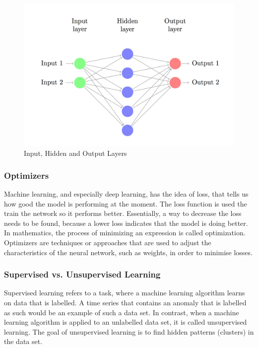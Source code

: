 \begin{figure}[h]
	\centering
	\includegraphics[scale=0.3]{Figures/layers}
	\decoRule
	\caption[Input, Hidden and Output Layers]{Input, Hidden and Output Layers \parencite{DennyBritz2015}}
	\label{fig:layers}
\end{figure}



\subsubsection{Optimizers} \label{optimizer}
Machine learning, and especially deep learning, has the idea of loss, that tells us how good the model is performing at the moment. The loss function is used the train the network so it performs better. Essentially, a way to decrease the loss needs to be found, because a lower loss indicates that the model is doing better. In mathematics, the process of minimizing an expression is called optimization. Optimizers are techniques or approaches that are used to adjust the characteristics of the neural network, such as weights, in order to minimise losses.

\subsubsection{Supervised vs. Unsupervised Learning}
Supervised learning refers to a task, where a machine learning algorithm learns on data that is labelled. A time series that contains an anomaly that is labelled as such would be an example of such a data set. In contrast, when a machine learning algorithm is applied to an unlabelled data set, it is called unsupervised learning. The goal of unsupervised learning is to find hidden patterns (clusters) in the data set.


